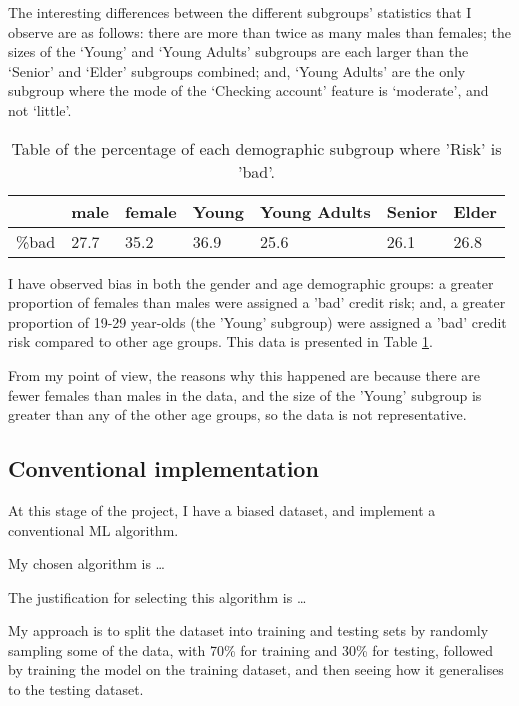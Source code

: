 \documentclass[conference]{IEEEtran}
\begin{document}
The interesting differences between the different subgroups' statistics that I observe are as follows: there are more than twice as many males than females; the sizes of the `Young' and `Young Adults' subgroups are each larger than the `Senior' and `Elder' subgroups combined; and, `Young Adults' are the only subgroup where the mode of the `Checking account' feature is `moderate', and not `little'. 

\begin{table}[h]
\begin{center}
\caption{Table of the percentage of each demographic subgroup where 'Risk' is 'bad'.}
\begin{tabularx}{0.49\textwidth} { |X|X|X|X|X|X|X| } 
    \hline
            & male & female & Young & Young Adults & Senior & Elder \\ 
        \hline
        \%bad & 27.7 & 35.2 & 36.9 & 25.6 & 26.1 & 26.8 \\
        \hline
\end{tabularx}
\label{table:4}
\end{center}
\end{table}

I have observed bias in both the gender and age demographic groups: a greater proportion of females than males were assigned a 'bad' credit risk; and, a greater proportion of 19-29 year-olds (the 'Young' subgroup) were assigned a 'bad' credit risk compared to other age groups. This data is presented in Table \ref{table:4}. 

From my point of view, the reasons why this happened are because there are fewer females than males in the data, and the size of the 'Young' subgroup is greater than any of the other age groups, so the data is not representative.

\subsection{Conventional implementation}
At this stage of the project, I have a biased dataset, and implement a conventional ML algorithm.

My chosen algorithm is \dots

The justification for selecting this algorithm is \dots

My approach is to split the dataset into training and testing sets by randomly sampling some of the data, with 70\% for training and 30\% for testing, followed by training the model on the training dataset, and then seeing how it generalises to the testing dataset. 
\end{document}
